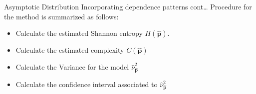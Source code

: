 \documentclass{beamer}
\begin{document}

\begin{frame}{Asymptotic Distribution Incorporating dependence patterns cont\dots} %
Procedure for the method is summarized as follows:

	\begin{itemize}
		\item Calculate the estimated Shannon entropy $H(\widehat{\mathbf{p}})$.
		\item Calculate the estimated complexity $C(\widehat{\bm{p}})$ 
		\item Calculate the Variance for the model $\widehat{\nu}^2_{\widehat{\mathbf{p}}}$  
		\item Calculate the confidence interval associated to $\widehat{\nu}^2_{\widehat{\mathbf{p}}}$  
	\end{itemize}
\end{frame}


	
\end{document}
